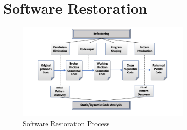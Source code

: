 



\section{Software Restoration}
\label{sec:methodology}

\begin{figure}
	\centering
	\includegraphics[width=0.78\textwidth]{images/HLPP2020Paper.png}
	\caption{Software Restoration Process}
	\label{fig:SoftRest}
\end{figure}



